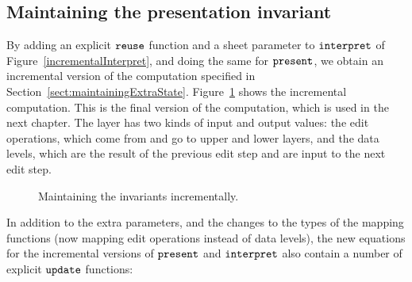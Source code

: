 %																
\subsection{Maintaining the presentation invariant}

By adding an explicit ${\tt reuse}$ function and a sheet parameter to ${\tt interpret}$ of Figure~\ref{incrementalInterpret}, and doing the same for ${\tt present}$, we obtain an incremental version of the computation specified in Section~\ref{sect:maintainingExtraState}. Figure~\ref{layerExtraStateInc} shows the incremental computation. This is the final version of the computation, which is used in the next chapter. The layer has two kinds of input and output values: the edit operations, which come from and go to upper and lower layers, and the data levels, which are the result of the previous edit step and are input to the next edit step.

\begin{figure}
\begin{center}
\begin{center}
\end{center}
\caption{Maintaining the invariants incrementally.}\label{layerExtraStateInc} 
\end{center}
\end{figure}

In addition to the extra parameters, and the changes to the types of the mapping functions (now mapping edit operations instead of data levels),  the new equations for the incremental versions of ${\tt present}$ and 
${\tt interpret}$ also contain a number of explicit  ${\tt update}$ functions: 

